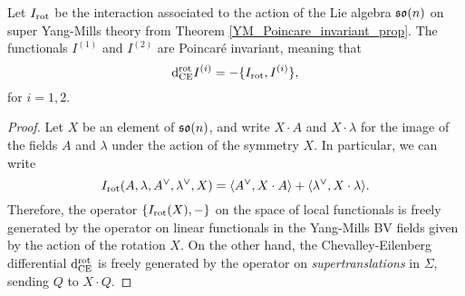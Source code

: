 \documentclass[10pt, oneside]{article}
\begin{document}
\begin{lemma} \label{SUSY_rotation_invariance_lemma}
Let $I_{\mathrm{rot}}$ be the interaction associated to the action of the Lie algebra $\mathfrak{so}(n)$ on super Yang-Mills theory from Theorem \ref{YM_Poincare_invariant_prop}.  The functionals $I^{(1)}$ and $I^{(2)}$ are Poincar\'e invariant, meaning that
\begin{equation}\label{rot_invariance_eqn}
 {\rm d}^{\mathrm{rot}}_{\mathrm{CE}} I^{(i)} = - \{I_{\mathrm{rot}}, I^{(i)}\},
\end{equation}
for $i=1,2$.
\end{lemma}

\begin{proof}
Let $X$ be an element of $\mathfrak{so}(n)$, and write $X \cdot A$ and $X \cdot \lambda$ for the image of the fields $A$ and $\lambda$ under the action of the symmetry $X$.  In particular, we can write
\[I_{\mathrm{rot}}(A,\lambda, A^\vee, \lambda^\vee, X) = \langle A^\vee, X \cdot A \rangle + \langle \lambda^\vee, X \cdot \lambda \rangle.
\]
Therefore, the operator $\{I_{\mathrm{rot}}(X), -\}$ on the space of local functionals is freely generated by the operator on linear functionals in the Yang-Mills BV fields given by the action of the rotation $X$.  On the other hand, the Chevalley-Eilenberg differential ${\rm d}^{\mathrm{rot}}_{\mathrm{CE}}$ is freely generated by the operator on \emph{supertranslations} in $\Sigma$, sending $Q$ to $X \cdot Q$.


\end{proof}
\end{document}
